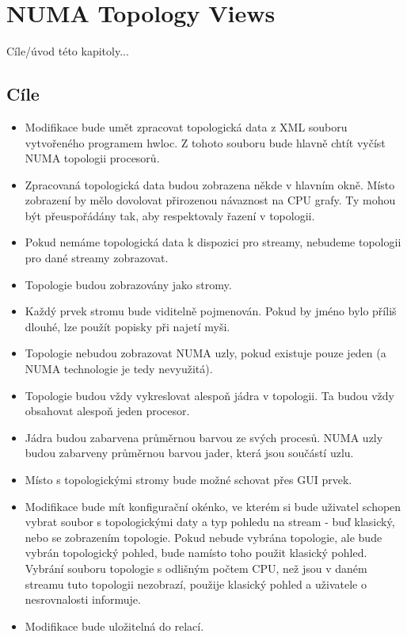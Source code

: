 \chapter{NUMA Topology Views}
Cíle/úvod této kapitoly...

\section{Cíle}

\begin{itemize}
    \item Modifikace bude umět zpracovat topologická data z XML souboru vytvořeného programem hwloc. Z tohoto souboru bude hlavně chtít vyčíst NUMA topologii procesorů.
    \item Zpracovaná topologická data budou zobrazena někde v hlavním okně. Místo zobrazení by mělo dovolovat přirozenou návaznost na CPU grafy. Ty mohou být přeuspořádány tak, aby respektovaly řazení v topologii.
    \item Pokud nemáme topologická data k dispozici pro streamy, nebudeme topologii pro dané streamy zobrazovat.
    \item Topologie budou zobrazovány jako stromy.
    \item Každý prvek stromu bude viditelně pojmenován. Pokud by jméno bylo příliš dlouhé, lze použít popisky při najetí myši.
    \item Topologie nebudou zobrazovat NUMA uzly, pokud existuje pouze jeden (a NUMA technologie je tedy nevyužitá).
    \item Topologie budou vždy vykreslovat alespoň jádra v topologii. Ta budou vždy obsahovat alespoň jeden procesor.
    \item Jádra budou zabarvena průměrnou barvou ze svých procesů. NUMA uzly budou zabarveny průměrnou barvou jader, která jsou součástí uzlu.
    \item Místo s topologickými stromy bude možné schovat přes GUI prvek.
    \item Modifikace bude mít konfigurační okénko, ve kterém si bude uživatel schopen vybrat soubor s topologickými daty a typ pohledu na stream - buď klasický, nebo se zobrazením topologie. Pokud nebude vybrána topologie, ale bude vybrán topologický pohled, bude namísto toho použit klasický pohled. Vybrání souboru topologie s odlišným počtem CPU, než jsou v daném streamu tuto topologii nezobrazí, použije klasický pohled a uživatele o nesrovnalosti informuje.
    \item Modifikace bude uložitelná do relací.
\end{itemize}


